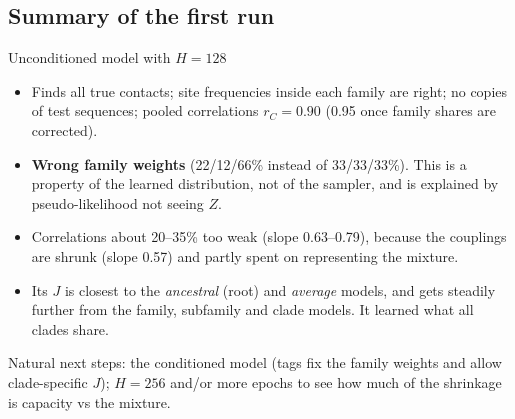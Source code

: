 \subsection{Summary of the first run}
\begin{keybox}{Unconditioned model with $H=128$}
\begin{itemize}[nosep]
\item[+] Finds all true contacts; site frequencies inside each family are right; no copies of test
      sequences; pooled correlations $r_C=0.90$ (0.95 once family shares are corrected).
\item[--] \textbf{Wrong family weights} (22/12/66\% instead of 33/33/33\%). This is a property of the
      learned distribution, not of the sampler, and is explained by pseudo-likelihood not seeing $Z$.
\item[--] Correlations about 20--35\% too weak (slope 0.63--0.79), because the couplings are shrunk
      (slope 0.57) and partly spent on representing the mixture.
\item[$\to$] Its $J$ is closest to the \emph{ancestral} (root) and \emph{average} models, and gets steadily
      further from the family, subfamily and clade models. It learned what all clades share.
\end{itemize}
Natural next steps: the conditioned model (tags fix the family weights and allow clade-specific $J$);
$H=256$ and/or more epochs to see how much of the shrinkage is capacity vs the mixture.
\end{keybox}
